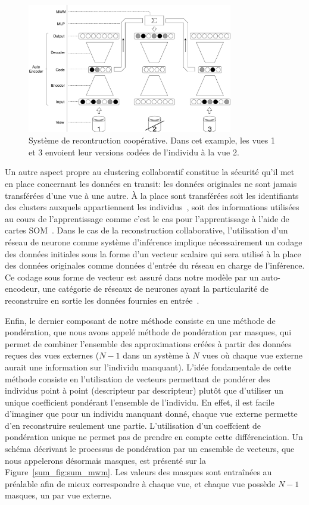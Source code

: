 	\begin{figure}[H]
		\centering
        \includegraphics[width=0.8\textwidth]{img/base_system.pdf}
        \caption{Système de recontruction coopérative. Dans cet example, les vues 1 et 3 envoient leur versions codées de l'individu à la vue 2.}
\label{sum_fig:sum_base}
	\end{figure}

    Un autre aspect propre au clustering collaboratif constitue la sécurité qu'il met en place concernant les données en transit: les données originales ne sont jamais transférées d'une vue à une autre. À la place sont transférées soit les identifiants des clusters auxquels appartiennent les individus~\cite{sublime2016collaborative,Sublime2015}, soit des informations utilisées au cours de l'apprentissage comme c'est le cas pour l'apprentissage à l'aide de cartes SOM~\cite{ghassany2012collaborative,maurel2017incremental}. Dans le cas de la reconstruction collaborative, l'utilisation d'un réseau de neurone comme système d'inférence implique nécessairement un codage des données initiales sous la forme d'un vecteur scalaire qui sera utilisé à la place des données originales comme données d'entrée du réseau en charge de l'inférence. Ce codage sous forme de vecteur est assuré dans notre modèle par un auto-encodeur, une catégorie de réseaux de neurones ayant la particularité de reconstruire en sortie les données fournies en entrée~\cite{vincent2008extracting}. 

    Enfin, le dernier composant de notre méthode consiste en une méthode de pondération, que nous avons appelé méthode de pondération par masques, qui permet de combiner l'ensemble des approximations créées à partir des données reçues des vues externes ($N-1$ dans un système à $N$ vues où chaque vue externe aurait une information sur l'individu manquant). L'idée fondamentale de cette méthode consiste en l'utilisation de vecteurs permettant de pondérer des individus point à point (descripteur par descripteur) plutôt que d'utiliser un unique coefficient pondérant l'ensemble de l'individu. En effet, il est facile d'imaginer que pour un individu manquant donné, chaque vue externe permette d'en reconstruire seulement une partie. L'utilisation d'un coeffcient de pondération unique ne permet pas de prendre en compte cette différenciation. Un schéma décrivant le processus de pondération par un ensemble de vecteurs, que nous appelerons désormais masques, est présenté sur la Figure~\ref{sum_fig:sum_mwm}. Les valeurs des masques sont entraînées au préalable afin de mieux correspondre à chaque vue, et chaque vue possède $N-1$ masques, un par vue externe.

